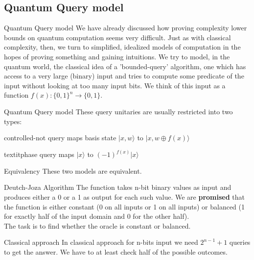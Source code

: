     \subsection{Quantum Query model}
    \begin{frame}{Quantum Query model}
        We have already discussed how proving complexity lower bounds on quantum 
        computation seems very difficult. Just as with classical complexity, then, we turn to simplified, 
        idealized models of computation in the hopes of proving something and gaining intuitions. 
        We try to model, in the quantum world, the classical idea of a 'bounded-query' algorithm, 
        one which has access to a very large (binary) input and tries to compute some predicate of the input 
        without looking at too many input bits. We think of this input as a function $f(x): \{0,1\}^n \rightarrow \{0,1\}$.
    \end{frame}
    \begin{frame}{Quantum Query model}
        These query unitaries are usually restricted into two types:
        \begin{block}{controlled-not query}
            maps basis state $|x,w\rangle$ to $|x,w \oplus f(x) \rangle$
        \end{block}
        \begin{block}{textitphase query}
            maps $|x\rangle$ to $(-1)^{f(x)}|x\rangle$
        \end{block}
        \begin{block}{Equivalency}
            These two models are equivalent.
        \end{block}
    \end{frame}
    \begin{frame}{Deutch-Joza Algorithm}
        The function takes n-bit binary values as input and produces either 
        a 0 or a 1 as output for each such value. We are \textbf{promised} that the function 
        is either constant (0 on all inputs or 1 on all inputs) 
        or balanced (1 for exactly half of the input domain and 0 for the other half).\\
        The task is to find whether the oracle is constant or balanced.
        \begin{block}{Classical approach}
            In classical approach for n-bits input we need $2^{n-1} + 1$ queries to get the answer.
            We have to at least check half of the possible outcomes.
        \end{block}
    \end{frame}
